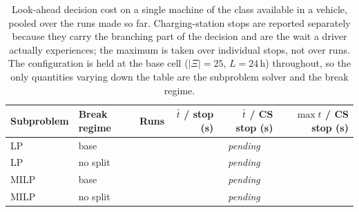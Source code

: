 \begin{table}[htbp]\centering
\caption{Look-ahead decision cost on a single machine of the class available in a vehicle, pooled over the runs made so far.  Charging-station stops are reported separately because they carry the branching part of the decision and are the wait a driver actually experiences; the maximum is taken over individual stops, not over runs.  The configuration is held at the base cell ($|\Xi| = 25$, $L = 24$\,h) throughout, so the only quantities varying down the table are the subproblem solver and the break regime.}
\label{tab:la_local}
\begin{tabular}{llrrrr}
\toprule
Subproblem & Break regime & Runs & $\bar{t}$ / stop (s) & $\bar{t}$ / CS stop (s) & $\max t$ / CS stop (s) \\
\midrule
LP & base & \multicolumn{4}{c}{\emph{pending}} \\
LP & no split & \multicolumn{4}{c}{\emph{pending}} \\
MILP & base & \multicolumn{4}{c}{\emph{pending}} \\
MILP & no split & \multicolumn{4}{c}{\emph{pending}} \\
\bottomrule
\end{tabular}
\end{table}
